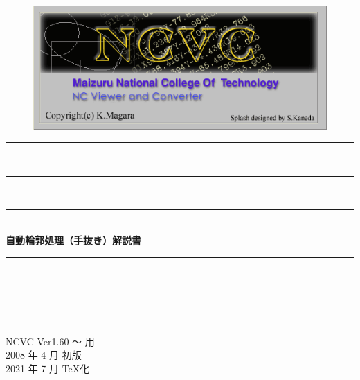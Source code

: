 
\vspace*{4zh}
\begin{figure}[H]
\centering
\includegraphics[scale=1.2]{logo.png}
\end{figure}

\vspace*{3zh}
\begin{center}
    \rule{6cm}{0.2zw}\\[-0.5zh]
    \rule{5cm}{0.1zw}\\[-0.5zh]
    \rule{4cm}{0.05zw}\\[1zh]
    {\Large \textbf{自動輪郭処理}}\textbf{（手抜き）}{\Large \textbf{解説書}}\\
    \rule{4cm}{0.05zw}\\[-0.5zh]
    \rule{5cm}{0.1zw}\\[-0.5zh]
    \rule{6cm}{0.2zw}

    \vspace*{8cm}
    NCVC Ver1.60 ～ 用\\
    2008 年 4 月 初版\\
    2021 年 7 月 \TeX 化
\end{center}

